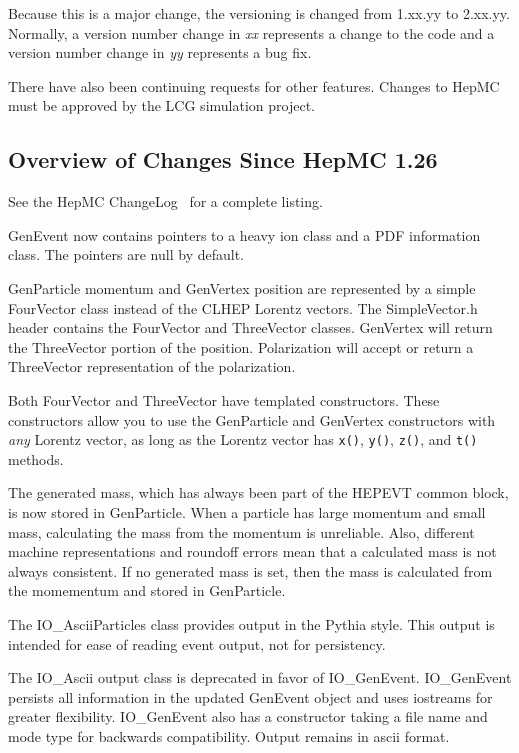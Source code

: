 \documentclass[11pt,letterpaper]{article}
\begin{document}
Because this is a major change, the versioning is changed 
from 1.xx.yy to 2.xx.yy.  Normally, a version number change in \emph{xx} 
represents a change to the code and a version number change in \emph{yy}
represents a bug fix.

There have also been continuing requests for other features.
Changes to HepMC must be approved by the LCG simulation project.  

%
%

\subsection{Overview of Changes Since HepMC 1.26}

See the HepMC ChangeLog~\cite{changelog} for a complete listing.

GenEvent now contains pointers to a heavy ion class and a PDF information class.
The pointers are null by default.

GenParticle momentum and GenVertex position are represented by a simple FourVector 
class instead of the CLHEP Lorentz vectors.  
The SimpleVector.h header contains the FourVector and ThreeVector classes.
GenVertex will return the ThreeVector portion of the position.
Polarization will accept or return a ThreeVector representation 
of the polarization.

Both FourVector and ThreeVector have templated constructors.  
These constructors allow you to use the GenParticle and GenVertex constructors
with \emph{any} Lorentz vector, as long as the Lorentz vector has 
\verb!x()!, \verb!y()!, \verb!z()!, and \verb!t()! methods.

The generated mass, which has always been part of the HEPEVT common block, 
is now stored in GenParticle.  
When a particle has large momentum and small mass, 
calculating the mass from the momentum is unreliable.
Also, different machine representations and roundoff errors mean that
a calculated mass is not always consistent.
If no generated mass is set, then the mass is calculated from the momementum 
and stored in GenParticle.

The IO\_AsciiParticles class provides output in the Pythia style.
This output is intended for ease of reading event output, not for persistency.

The IO\_Ascii output class is deprecated in favor of IO\_GenEvent.  
IO\_GenEvent persists all information in the updated GenEvent object and
uses iostreams for greater flexibility.  IO\_GenEvent also has a 
constructor taking a file name and mode type for backwards compatibility. 
Output remains in ascii format.
\end{document}
